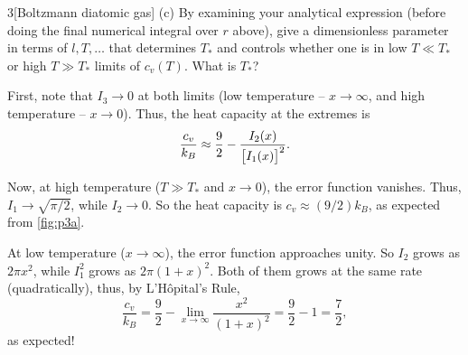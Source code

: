\documentclass[12pt]{article}
\begin{document}
\begin{problem}{3}[Boltzmann diatomic gas]
(c) By examining your analytical expression (before doing the final numerical
integral over $r$ above), give a dimensionless parameter in terms of
$l,T,\hdots$ that determines $T_\ast$ and controls whether one is in low $T\ll
T_\ast$ or high $T\gg T_\ast$ limits of $c_v(T)$. What is $T_\ast$?
\begin{solution}
First, note that $I_3\to0$ at both limits (low temperature -- $x\to\infty$,
and high temperature -- $x\to0$). Thus, the heat capacity at the extremes is
\begin{equation}
    \frac{c_v}{k_B}
    \approx\frac92-\frac{I_2(x)}{\qty[I_1(x)]^2}.
\end{equation}

Now, at high temperature ($T\gg T_\ast$ and $x\to0$), the error function
vanishes. Thus, $I_1\to\sqrt{\pi/2}$, while $I_2\to0$. So the heat capacity is
$c_v\approx (9/2)k_B$, as expected from \cref{fig:p3a}.

At low temperature ($x\to\infty$), the error function approaches unity. So $I_2$
grows as $2\pi x^2$, while $I_1^2$ grows as $2\pi(1+x)^2$. Both of them grows at
the same rate (quadratically), thus, by L'Hôpital's Rule,
\begin{equation}
    \frac{c_v}{k_B}=\frac92-\lim_{x\to\infty}\frac{x^2}{(1+x)^2} 
    =\frac92-1=\frac72,
\end{equation}
as expected!
\end{solution}


\end{problem}
\end{document}
